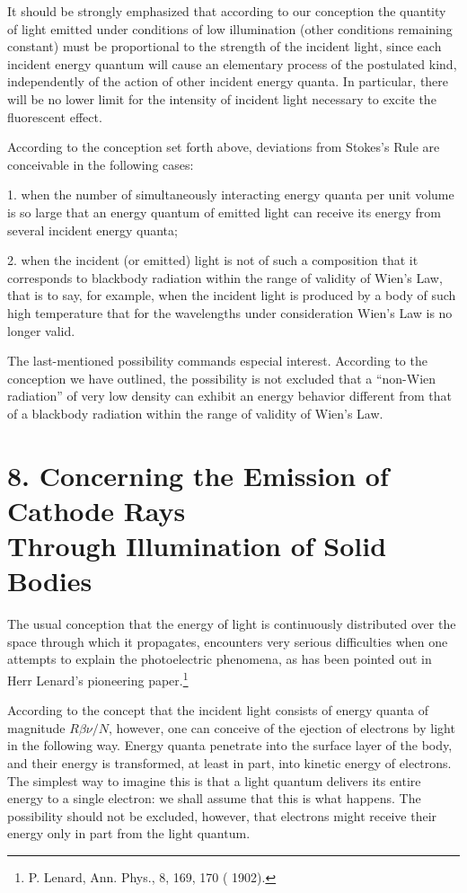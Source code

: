 \documentclass[12pt]{article}
\begin{document}
It should be strongly emphasized that according to our conception the quantity
of light emitted under conditions of low illumination (other conditions
remaining constant) must be proportional to the strength of the incident light,
since each incident energy quantum will cause an elementary process of the
postulated kind, independently of the action of other incident energy quanta. In
particular, there will be no lower limit for the intensity of incident light
necessary to excite the fluorescent effect.

According to the conception set forth above, deviations from Stokes's Rule are
conceivable in the following cases:

1. when the number of simultaneously interacting energy quanta per unit volume
   is so large that an energy quantum of emitted light can receive its energy
   from several incident energy quanta;

2. when the incident (or emitted) light is not of such a composition that it
   corresponds to blackbody radiation within the range of validity of Wien's 
Law, that is to say, for example, when the incident light is produced by a body
of such high temperature that for the wavelengths under consideration 
Wien's Law is no longer valid. 

The last-mentioned possibility commands especial interest. According to the
conception we have outlined, the possibility is not excluded that a ``non-Wien
radiation'' of very low density can exhibit an energy behavior different from
that of a blackbody radiation within the range of validity of Wien's Law.

\vspace{0.5cm}
\section*{
{\bf 8. Concerning the Emission of Cathode Rays\\ Through  Illumination of
Solid Bodies}}
\vspace{0.5cm}
 
The usual conception that the energy of light is continuously distributed over
the space through which it propagates, encounters very serious difficulties when
one attempts to explain the photoelectric phenomena, as has been pointed out in
Herr Lenard's pioneering paper.\footnote{P. Lenard, Ann. Phys., 8, 169, 170 (
1902).}

According to the concept that the incident light consists of energy quanta of
magnitude $R \beta \nu/N$, however, one can conceive of the ejection of
electrons by light in the following way. Energy quanta penetrate into the
surface layer of the body, and their energy is transformed, at least in part,
into kinetic energy of electrons. The simplest way to imagine this is that a
light quantum delivers its entire energy to a single electron: we shall assume
that this is what happens. The possibility should not be excluded, however, that
electrons might receive their energy only in part from the light quantum. 
\end{document}

